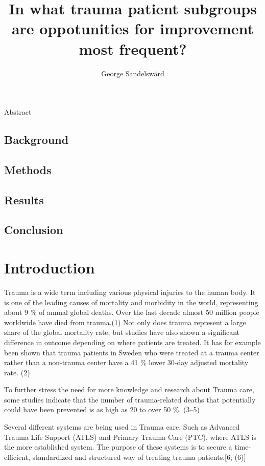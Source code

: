 \documentclass[
]{article}
\title{In what trauma patient subgroups are oppotunities for improvement
most frequent?}
\author{George Sandelswärd}
\date{}
\begin{document}
\maketitle

Abstract

\hypertarget{background}{%
\subsection{Background}\label{background}}

\hypertarget{methods}{%
\subsection{Methods}\label{methods}}

\hypertarget{results}{%
\subsection{Results}\label{results}}

\hypertarget{conclusion}{%
\subsection{Conclusion}\label{conclusion}}

\hypertarget{introduction}{%
\section{Introduction}\label{introduction}}

Trauma is a wide term including various physical injuries to the human
body. It is one of the leading causes of mortality and morbidity in the
world, representing about 9 \% of annual global deaths. Over the last
decade almost 50 million people worldwide have died from trauma.(1) Not
only does trauma represent a large share of the global mortality rate,
but studies have also shown a significant difference in outcome
depending on where patients are treated. It has for example been shown
that trauma patients in Sweden who were treated at a trauma center
rather than a non-trauma center have a 41 \% lower 30-day adjusted
mortality rate. (2)

To further stress the need for more knowledge and research about Trauma
care, some studies indicate that the number of trauma-related deaths
that potentially could have been prevented is as high as 20 to over 50
\%. (3--5)

Several different systems are being used in Trauma care. Such as
Advanced Trauma Life Support (ATLS) and Primary Trauma Care (PTC), where
ATLS is the more established system. The purpose of these systems is to
secure a time-efficient, standardized and structured way of treating
trauma patients.{[}6; (6){]}
\end{document}
